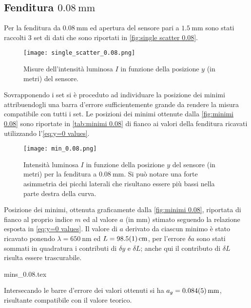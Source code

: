 \documentclass[../main.tex]{subfiles}
\begin{document}
\subsection{Fenditura $\qty{0.08}{\milli\metre}$}

Per la fenditura da $\qty{0.08}{\mm}$ ed apertura del sensore pari a $\qty{1.5}{\mm}$ sono stati raccolti $3$ set di dati che sono riportati in \autoref{fig:single scatter 0.08}.

\begin{figure}[ht!]
    \centering
    \texttt{[image: single\_scatter\_0.08.png]}
    \caption{Misure dell'intensità luminosa $I$ in funzione della posizione $y$ (in metri) del sensore.} %
    \label{fig:single scatter 0.08}
\end{figure}

Sovrapponendo i set si è proceduto ad individuare la posizione dei minimi attribuendogli una barra d'errore sufficientemente grande da rendere la misura compatibile con tutti i set. Le posizioni dei minimi ottenute dalla \autoref{fig:minimi 0.08} sono riportate in \autoref{tab:minimi 0.08} di fianco ai valori della fenditura ricavati utilizzando l'\autoref{eq:y=0 values}.

\begin{figure}[ht!]
    \centering
    \texttt{[image: min\_0.08.png]}
    \caption{Intensità luminosa $I$ in funzione della posizione $y$ del sensore (in metri) per la fenditura a $\qty{0.08}{\mm}$. Si può notare una forte asimmetria dei picchi laterali che risultano essere più bassi nella parte destra della curva.} %
    \label{fig:minimi 0.08}
\end{figure}

\begin{table}[ht!]
    \centering
    \caption{Posizione dei minimi, ottenuta graficamente dalla \autoref{fig:minimi 0.08}, riportata di fianco al proprio indice $m$ ed al valore $a$ (in $\si{\mm}$) stimato seguendo la relazione esposta in \autoref{eq:y=0 values}. Il valore di $a$ derivato da ciascun minimo è stato ricavato ponendo $\lambda = \qty{650}{\nm}$ ed $L = \qty{98.5+-0.1}{\cm}$, per l'errore $\delta a$ sono stati sommati in quadratura i contributi di $\delta y$ e $\delta L$; anche qui il contributo di $\delta L$ risulta essere trascurabile.}
    {mins_0.08.tex}
    \label{tab:minimi 0.08}
\end{table}

Intersecando le barre d'errore dei valori ottenuti si ha $a_g = \qty{0.084+-0.005}{\mm}$, risultante compatibile con il valore teorico.
\end{document}
